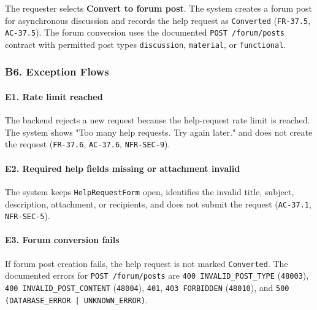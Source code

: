 \documentclass[12pt]{article}
\begin{document}
The requester selects \textbf{Convert to forum post}. The system creates a forum post for asynchronous discussion and records the help request as \texttt{Converted} (\texttt{FR-37.5}, \texttt{AC-37.5}). The forum conversion uses the documented \texttt{POST /forum/posts} contract with permitted post types \texttt{discussion}, \texttt{material}, or \texttt{functional}.
\par\medskip

\hypertarget{sec:b6-exception-flows}{}
\subsubsection*{B6. Exception Flows}
\par\medskip

\hypertarget{sec:e1-rate-limit-reached}{}
\paragraph*{E1. Rate limit reached}
\par\medskip

The backend rejects a new request because the help-request rate limit is reached. The system shows "Too many help requests. Try again later." and does not create the request (\texttt{FR-37.6}, \texttt{AC-37.6}, \texttt{NFR-SEC-9}).
\par\medskip

\hypertarget{sec:e2-required-help-fields-missing-or-attachment-invalid}{}
\paragraph*{E2. Required help fields missing or attachment invalid}
\par\medskip

The system keeps \texttt{HelpRequestForm} open, identifies the invalid title, subject, description, attachment, or recipients, and does not submit the request (\texttt{AC-37.1}, \texttt{NFR-SEC-5}).
\par\medskip

\hypertarget{sec:e3-forum-conversion-fails}{}
\paragraph*{E3. Forum conversion fails}
\par\medskip

If forum post creation fails, the help request is not marked \texttt{Converted}. The documented errors for \texttt{POST /forum/posts} are \texttt{400 INVALID\_POST\_TYPE} (\texttt{48003}), \texttt{400 INVALID\_POST\_CONTENT} (\texttt{48004}), \texttt{401}, \texttt{403 FORBIDDEN} (\texttt{48010}), and \texttt{500 (DATABASE\_ERROR | UNKNOWN\_ERROR)}.
\par\medskip
\end{document}

